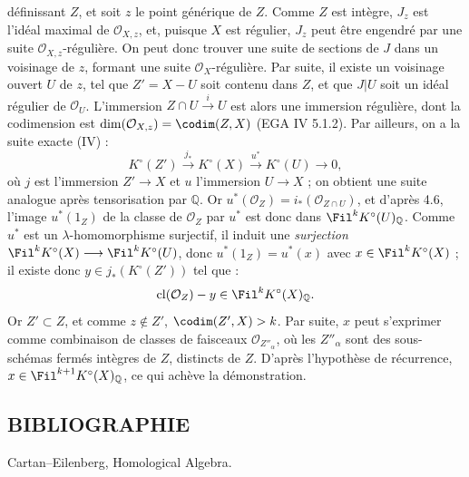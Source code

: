 définissant \(Z\), et soit \(z\) le point générique de \(Z\). Comme \(Z\) est intègre, \(J_z\) est l'idéal maximal de \(\mathcal O_{X,z}\), et, puisque \(X\) est régulier, \(J_z\) peut être engendré par une suite \(\mathcal O_{X,z}\)-régulière. On peut donc trouver une suite de sections de \(J\) dans un voisinage de \(z\), formant une suite \(\mathcal O_X\)-régulière. Par suite, il existe un voisinage ouvert \(U\) de \(z\), tel que \(Z'=X-U\) soit contenu dans \(Z\), et que \(J|U\) soit un idéal régulier de \(\mathcal O_U\). L'immersion \(Z\cap U\xrightarrow{i}U\) est alors une immersion régulière, dont la codimension est \(\dim(\mathcal O_{X,z})=\codim(Z,X)\) (EGA IV 5.1.2). Par ailleurs, on a la suite exacte (IV\qquad) :
\[
  K^\circ(Z')\xrightarrow{j_*}K^\circ(X)
  \xrightarrow{u^*}K^\circ(U)\to0,
\]
où \(j\) est l'immersion \(Z'\to X\) et \(u\) l'immersion \(U\to X\) ; on obtient une suite analogue après tensorisation par \(\mathbb Q\). Or \(u^*(\mathcal O_Z)=i_*(\mathcal O_{Z\cap U})\), et d'après 4.6, l'image \(u^*(1_Z)\) de la classe de \(\mathcal O_Z\) par \(u^*\) est donc dans \(\Fil^kK^\circ(U)_{\mathbb Q}\). Comme \(u^*\) est un \(\lambda\)-homomorphisme surjectif, il induit une \emph{surjection} \(\Fil^kK^\circ(X)\longrightarrow \Fil^kK^\circ(U)\), donc \(u^*(1_Z)=u^*(x)\) avec \(x\in\Fil^kK^\circ(X)\) ; il existe donc \(y\in j_*(K^\circ(Z'))\) tel que :
\[
  \operatorname{cl}(\mathcal O_Z)-y\in\Fil^kK^\circ(X)_{\mathbb Q}.
\]
Or \(Z'\subset Z\), et comme \(z\notin Z'\), \(\codim(Z',X)>k\). Par suite, \(x\) peut s'exprimer comme combinaison de classes de faisceaux \(\mathcal O_{Z''_\alpha}\), où les \(Z''_\alpha\) sont des sous-schémas fermés intègres de \(Z\), distincts de \(Z\). D'après l'hypothèse de récurrence, \(x\in\Fil^{k+1}K^\circ(X)_{\mathbb Q}\), ce qui achève la démonstration.

\subsection*{BIBLIOGRAPHIE}
\begin{enumerate}[label={[\arabic*]}]
\item Cartan--Eilenberg, Homological Algebra.
\end{enumerate}



\providecommand{\etale}{\'etale}
\providecommand{\Ch}{\operatorname{Ch}}


